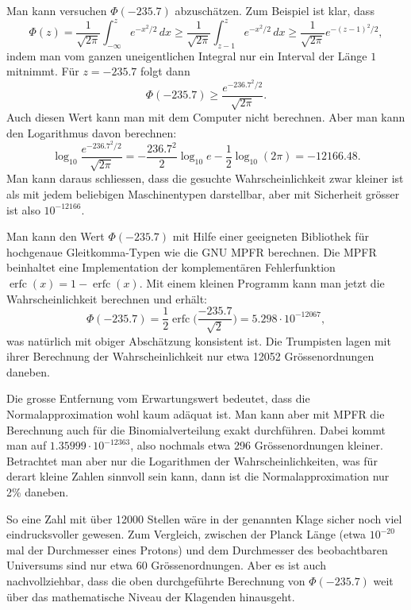 \begin{diskussion}
Man kann versuchen $\Phi(-235.7)$ abzuschätzen.
Zum Beispiel ist klar, dass
\[
\Phi(z)
=
\frac{1}{\sqrt{2\pi}}
\int_{-\infty}^{z} e^{-x^2/2}\,dx
\ge
\frac{1}{\sqrt{2\pi}}
\int_{z-1}^{z} e^{-x^2/2}\,dx
\ge
\frac{1}{\sqrt{2\pi}}
e^{-(z-1)^2/2},
\]
indem man vom ganzen uneigentlichen Integral nur ein Interval der Länge $1$
mitnimmt.
Für $z=-235.7$ folgt dann
\[
\Phi(-235.7)
\ge
\frac{e^{-236.7^2/2}}{\sqrt{2\pi}}.
\]
Auch diesen Wert kann man mit dem Computer nicht berechnen.
Aber man kann den Logarithmus davon berechnen:
\[
\log_{10}
\frac{e^{-236.7^2/2}}{\sqrt{2\pi}}
=
-\frac{236.7^2}{2} \log_{10}e - \frac12 \log_{10}(2\pi)
=
-12166.48.
\]
Man kann daraus schliessen, dass die gesuchte Wahrscheinlichkeit
zwar kleiner ist als mit jedem beliebigen Maschinentypen darstellbar,
aber mit Sicherheit grösser ist also $10^{-12166}$.

Man kann den Wert $\Phi(-235.7)$ mit Hilfe einer geeigneten
Bibliothek für hochgenaue Gleitkomma-Typen wie die GNU MPFR
berechnen.
Die MPFR beinhaltet eine Implementation der komplementären Fehlerfunktion
$\operatorname{erfc}(x) = 1-\operatorname{erfc}(x)$.
Mit einem kleinen Programm kann man jetzt die Wahrscheinlichkeit
berechnen und erhält:
\[
\Phi(-235.7)
=
\frac12\operatorname{erfc}\biggl(\frac{-235.7}{\sqrt{2}}\biggr)
=
5.298\cdot10^{-12067},
\]
was natürlich mit obiger Abschätzung konsistent ist.
Die Trumpisten lagen mit ihrer Berechnung der Wahrscheinlichkeit
nur etwa 12052 Grössenordnungen daneben.

Die grosse Entfernung vom Erwartungswert bedeutet, dass die Normalapproximation
wohl kaum adäquat ist.
Man kann aber mit MPFR die Berechnung auch für die Binomialverteilung exakt
durchführen.
Dabei kommt man auf $1.35999\cdot 10^{-12363}$, also nochmals etwa
296 Grössenordnungen kleiner.
Betrachtet man aber nur die Logarithmen der Wahrscheinlichkeiten,
was für derart kleine Zahlen sinnvoll sein kann, dann ist die
Normalapproximation nur 2\% daneben.

So eine Zahl mit über 12000 Stellen wäre in der genannten Klage sicher
noch viel eindrucksvoller gewesen.
Zum Vergleich, zwischen der Planck Länge (etwa $10^{-20}$ mal der Durchmesser
eines Protons) und dem Durchmesser des beobachtbaren Universums sind nur
etwa 60 Grössenordnungen.
Aber es ist auch nachvollziehbar, dass die oben durchgeführte Berechnung
von $\Phi(-235.7)$ weit über das mathematische Niveau der Klagenden
hinausgeht.
\end{diskussion}




